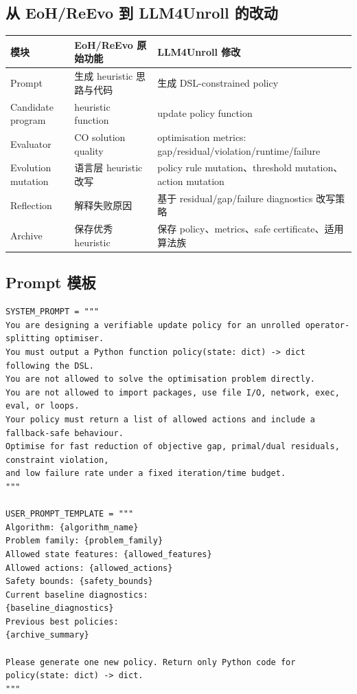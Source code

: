 \documentclass[12pt,a4paper]{ctexart}
\begin{document}
\subsection{从 EoH/ReEvo 到 LLM4Unroll 的改动}

\begin{longtable}{p{}p{}p{}}
\toprule
模块 & EoH/ReEvo 原始功能 & LLM4Unroll 修改 \\
\midrule
Prompt & 生成 heuristic 思路与代码 & 生成 DSL-constrained policy \\
Candidate program & heuristic function & update policy function \\
Evaluator & CO solution quality & optimisation metrics: gap/residual/violation/runtime/failure \\
Evolution mutation & 语言层 heuristic 改写 & policy rule mutation、threshold mutation、action mutation \\
Reflection & 解释失败原因 & 基于 residual/gap/failure diagnostics 改写策略 \\
Archive & 保存优秀 heuristic & 保存 policy、metrics、safe certificate、适用算法族 \\
\bottomrule
\end{longtable}

\subsection{Prompt 模板}

\begin{lstlisting}[style=pythonstyle]
SYSTEM_PROMPT = """
You are designing a verifiable update policy for an unrolled operator-splitting optimiser.
You must output a Python function policy(state: dict) -> dict following the DSL.
You are not allowed to solve the optimisation problem directly.
You are not allowed to import packages, use file I/O, network, exec, eval, or loops.
Your policy must return a list of allowed actions and include a fallback-safe behaviour.
Optimise for fast reduction of objective gap, primal/dual residuals, constraint violation,
and low failure rate under a fixed iteration/time budget.
"""

USER_PROMPT_TEMPLATE = """
Algorithm: {algorithm_name}
Problem family: {problem_family}
Allowed state features: {allowed_features}
Allowed actions: {allowed_actions}
Safety bounds: {safety_bounds}
Current baseline diagnostics:
{baseline_diagnostics}
Previous best policies:
{archive_summary}

Please generate one new policy. Return only Python code for policy(state: dict) -> dict.
"""
\end{lstlisting}
\end{document}
